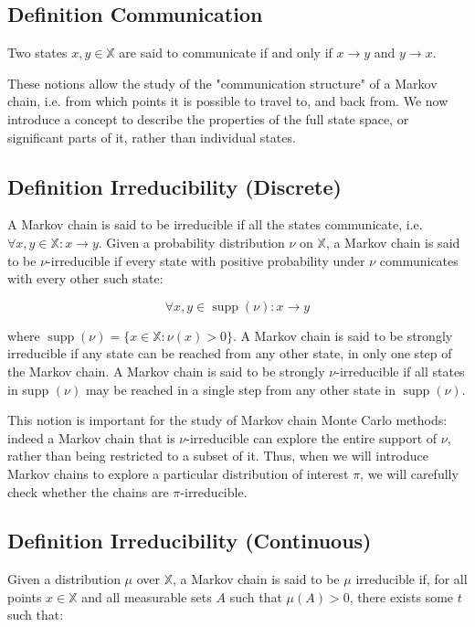 \documentclass[10pt]{article}
\begin{document}
\subsection{Definition Communication}
Two states $x, y \in \mathbb{X}$ are said to communicate if and only if $x \rightarrow y$ and $y \rightarrow x$.

These notions allow the study of the "communication structure" of a Markov chain, i.e. from which points it is possible to travel to, and back from. We now introduce a concept to describe the properties of the full state space, or significant parts of it, rather than individual states.
\subsection{Definition Irreducibility (Discrete)}
A Markov chain is said to be irreducible if all the states communicate, i.e. $\forall x, y \in \mathbb{X}: x \rightarrow y$. Given a probability distribution $\nu$ on $\mathbb{X}$, a Markov chain is said to be $\nu$-irreducible if every state with positive probability under $\nu$ communicates with every other such state:

$$
\forall x, y \in \operatorname{supp}(\nu): x \rightarrow y
$$

where $\operatorname{supp}(\nu)=\{x \in \mathbb{X}: \nu(x)>0\}$. A Markov chain is said to be strongly irreducible if any state can be reached from any other state, in only one step of the Markov chain. A Markov chain is said to be strongly $\nu$-irreducible if all states in supp $(\nu)$ may be reached in a single step from any other state in $\operatorname{supp}(\nu)$.

This notion is important for the study of Markov chain Monte Carlo methods: indeed a Markov chain that is $\nu$-irreducible can explore the entire support of $\nu$, rather than being restricted to a subset of it. Thus, when we will introduce Markov chains to explore a particular distribution of interest $\pi$, we will carefully check whether the chains are $\pi$-irreducible.

\subsection{Definition Irreducibility (Continuous)}
Given a distribution $\mu$ over $\mathbb{X}$, a Markov chain is said to be $\mu$ irreducible if, for all points $x \in \mathbb{X}$ and all measurable sets $A$ such that $\mu(A)>0$, there exists some $t$ such that:
\end{document}
